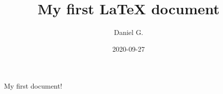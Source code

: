 \documentclass{article}  %
\title{My first \LaTeX{} document}
\date{2020-09-27}
\author{Daniel G.}
\begin{document}
   \maketitle  %
   \newpage  %

   My first document!
\end{document}
